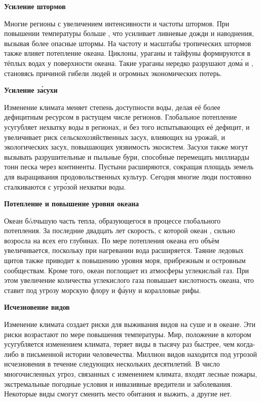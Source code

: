 \textbf{Усиление штормов}

Многие регионы  с увеличением интенсивности и частоты  штормов. При повышении температуры  больше , что усиливает ливневые дожди и наводнения, вызывая более опасные штормы. На частоту и масштабы тропических штормов также влияет потепление океана. Циклоны, ураганы и тайфуны формируются в тёплых водах у поверхности океана. Такие ураганы нередко разрушают дом\'{а} и , становясь причиной гибели людей и огромных экономических потерь.

\textbf{Усиление з\'{а}сухи}

Изменение климата меняет степень доступности воды, делая её более дефицитным ресурсом в растущем числе регионов. Глобальное потепление усугубляет нехватку воды в регионах, и без того испытывающих её дефицит, и увеличивает риск сельскохозяйственных засух, влияющих на урожай, и экологических засух, повышающих уязвимость экосистем. Засухи также могут вызывать разрушительные  и пыльные бури, способные перемещать миллиарды тонн песка через континенты. Пустыни расширяются, сокращая площадь земель для выращивания продовольственных культур. Сегодня многие люди постоянно сталкиваются с угр\'{о}зой нехватки воды.

\textbf{Потепление и повышение уровня океана}

Океан  бóлчьшую часть тепла, образующегося в процессе глобального потепления. За последние двадцать лет скорость, с которой океан , сильно возросла на всех его глубинах. По мере потепления океана его объём увеличивается, поскольку при нагревании вода расширяется. Таяние ледовых щитов также приводит к повышению уровня моря,  прибрежным и островным сообществам. Кроме того, океан поглощает из атмосферы углекислый газ. При этом увеличение количества углекислого газа повышает кислотность океана, что ставит под угрозу морскую флору и ф\'{а}уну и коралловые рифы.

\textbf{Исчезновение видов}

Изменение климата создает риски для выживания видов на суше и в океане. Эти риски возрастают по мере повышения температуры. Мир, положение в котором усугубляется изменением климата, теряет виды в тысячу раз быстрее, чем когда-либо в письменной истории человечества. Миллион видов находится под угрозой исчезновения в течение следующих нескольких десятилетий. В число многочисленных угроз, связанных с изменением климата, входят лесные пожары, экстремальные погодные условия и инвазивные вредители и заболевания. Некоторые виды смогут сменить место обитания и выжить, а другие нет.

